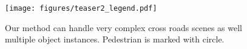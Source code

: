 \documentclass[10pt,twocolumn,letterpaper]{article}
\begin{document}
\begin{figure}
    \centering
    \texttt{[image: figures/teaser2\_legend.pdf]}
    \caption{Our method can handle very complex cross roads scenes as well multiple object instances. Pedestrian is marked with circle.}
    \label{fig:teaser2}
    \vspace{-1em}
\end{figure}

\begin{comment}
One of the closest works to ours is \cite{DBLP:conf/cvpr/HomayounfarMLU18}, where the authors detect lane boundaries on highway in the form of polylines. Their method accepts sparse 3D point clouds as input and utilize an RNN to detect the initial boundary points. The initial points are used as seeds for the Polygon-RNN \cite{DBLP:conf/cvpr/AcunaLKF18}. Their method is substantially different than ours because of their input (point clouds vs monocular image), setting (highway lane boundaries vs lane centerlines in unrestricted setting) and method (RNN + Polygon-RNN).

Authors of \cite{DBLP:journals/corr/abs-2012-12377} build a directed acyclic graph on lane boundaries on highways. They use BEV LiDAR intensity images as input. The method iteratively estimates a candidate region for the next vertex of a given boundary as well as the state. The state variable predicts the normal continuation of the boundary, existence of a fork or termination of the boundary. They use distance transform to extract a heatmap of boundary lines and apply thresholding and skeletonization on this heatmap and extract initial points. While this approach is suitable for aerial highway boundary lines, it is not applicable for city traffic centerline estimation since boundaries are not as clearly marked and there are very complex scenes with crossroads. Moreover, use of aerial LiDAR is a very different setting than onboard camera. 

Another structured output method is \cite{DBLP:journals/corr/abs-2012-12160}, where the authors deal with extracting road boundaries from aerial images and LiDAR scans. They use a recurrent method to estimate vertices of the polylines that cover the road boundaries. This method is different than ours because of their input (aerial images + LiDAR vs monocular image), setting (road boundary vs lane centerlines) and method (RNN).



Segmentation of crosswalks has been tackled in a structured fashion in \cite{DBLP:journals/corr/abs-2012-11585}. The segmentation and boundary detection are used in creating candidate polygons that are processed in energy maximization problem to produce final output. Similar to other related work, they also utilize LiDAR. Their problem formulation is based on distance transform and energy maximization.
\end{comment}
\end{document}
